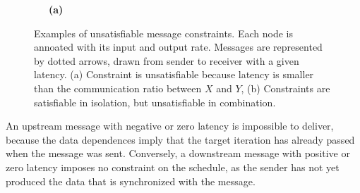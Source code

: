 \begin{figure}[t]
\vspace{-8pt}
\begin{center}
\hspace{0.7in}
 \vspace{6pt}

{\tiny ~}{\tiny ~}~{\bf (a)}\hspace{1in}{\bf (b)}~~~{\tiny ~}{\tiny ~}
\vspace{-3pt}
\caption{{\small Examples of unsatisfiable message constraints.  Each
node is annoated with its input and output rate.  Messages are
represented by dotted arrows, drawn from sender to receiver with a
given latency.  (a) Constraint is unsatisfiable because latency is
smaller than the communication ratio between $X$ and $Y$, (b)
Constraints are satisfiable in isolation, but unsatisfiable in
combination.  \protect\label{fig:infeasible}}}
\end{center}
\vspace{-18pt}
\end{figure}

An upstream message with negative or zero latency is impossible to
deliver, because the data dependences imply that the target iteration
has already passed when the message was sent.  Conversely, a
downstream message with positive or zero latency imposes no constraint
on the schedule, as the sender has not yet produced the data that is
synchronized with the message.

